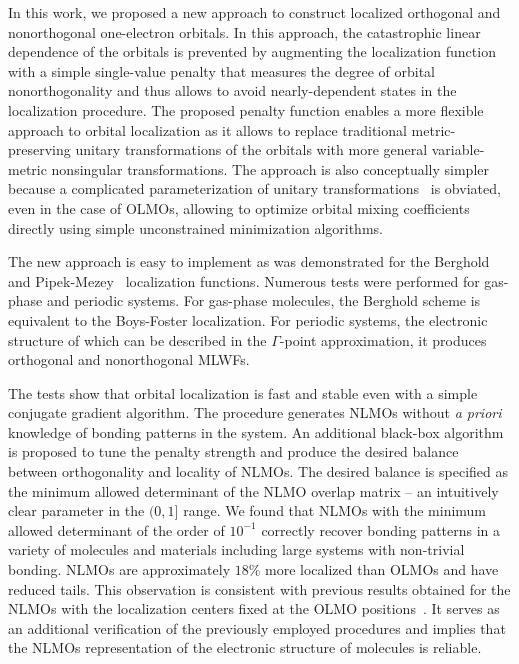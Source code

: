 \documentclass[aps,prl,reprint,amsmath,amssymb]{revtex4-1}
\begin{document}
In this work, we proposed a new approach to construct localized orthogonal and nonorthogonal one-electron orbitals. 
In this approach, the catastrophic linear dependence of the orbitals is prevented by augmenting the localization function with a simple single-value penalty that measures the degree of orbital nonorthogonality and thus allows to avoid nearly-dependent states in the localization procedure.
%
The proposed penalty function enables a more flexible approach to orbital localization as it allows to replace traditional metric-preserving unitary transformations of the orbitals with more general variable-metric nonsingular transformations. The approach is also conceptually simpler because a complicated parameterization of unitary transformations~\cite{hoyvik2017generalising} is obviated, even in the case of OLMOs, allowing to optimize orbital mixing coefficients directly using simple unconstrained minimization algorithms. 

The new approach is easy to implement as was demonstrated for the Berghold~\cite{berghold2000general} and Pipek-Mezey~\cite{pipek1989fast} localization functions. 
Numerous tests were performed for gas-phase and periodic systems. For gas-phase molecules, the Berghold scheme is equivalent to the Boys-Foster localization. 
For periodic systems, the electronic structure of which can be described in the $\Gamma$-point approximation, it produces orthogonal and nonorthogonal MLWFs. 

The tests show that orbital localization is fast and stable even with a simple conjugate gradient algorithm. The procedure generates NLMOs without \emph{a priori} knowledge of bonding patterns in the system. 
An additional black-box algorithm is proposed to tune the penalty strength and produce the desired balance between orthogonality and locality of NLMOs. The desired balance is specified as the minimum allowed determinant of the NLMO overlap matrix -- an intuitively clear parameter in the $(0,1]$ range. 
We found that NLMOs with the minimum allowed determinant of the order of $10^{-1}$ correctly recover bonding patterns in a variety of molecules and materials including large systems with non-trivial bonding. NLMOs are approximately $18\%$ more localized than OLMOs and have reduced tails.
This observation is consistent with previous results obtained for the NLMOs with the localization centers fixed at the OLMO positions~\cite{feng2004An_efficient, cui2010efficient}. It serves as an additional verification of the previously employed procedures and implies that the NLMOs representation of the electronic structure of molecules is reliable. 
\end{document}
